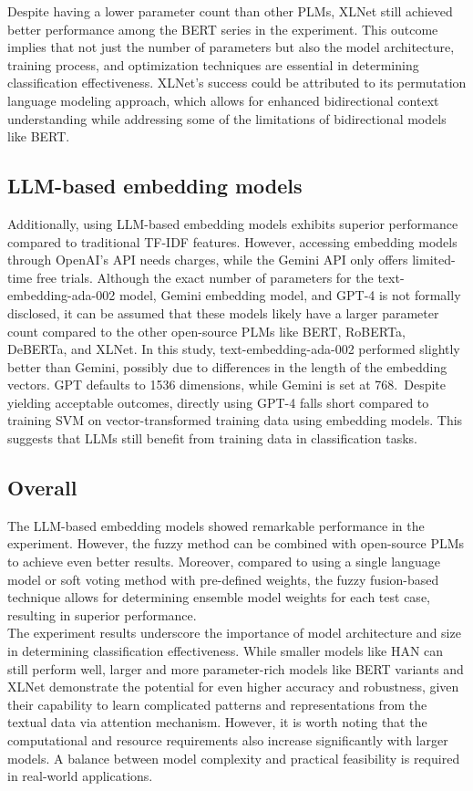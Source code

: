 Despite having a lower parameter count than other PLMs, XLNet still achieved better performance among the BERT series in the experiment. This outcome implies that not just the number of parameters but also the model architecture, training process, and optimization techniques are essential in determining classification effectiveness. XLNet's success could be attributed to its permutation language modeling approach, which allows for enhanced bidirectional context understanding while addressing some of the limitations of bidirectional models like BERT.\\

\subsection{LLM-based embedding models}
Additionally, using LLM-based embedding models exhibits superior performance compared to traditional TF-IDF features. However, accessing embedding models through OpenAI's API needs charges, while the Gemini API only offers limited-time free trials. Although the exact number of parameters for the text-embedding-ada-002 model, Gemini embedding model, and GPT-4 is not formally disclosed, it can be assumed that these models likely have a larger parameter count compared to the other open-source PLMs like BERT, RoBERTa, DeBERTa, and XLNet. In this study, text-embedding-ada-002 performed slightly better than Gemini, possibly due to differences in the length of the embedding vectors. GPT defaults to 1536 dimensions, while Gemini is set at 768. Despite yielding acceptable outcomes, directly using GPT-4 falls short compared to training SVM on vector-transformed training data using embedding models. This suggests that LLMs still benefit from training data in classification tasks. \\

\subsection{Overall}
The LLM-based embedding models showed remarkable performance in the experiment. However, the fuzzy method can be combined with open-source PLMs to achieve even better results. Moreover, compared to using a single language model or soft voting method with pre-defined weights, the fuzzy fusion-based technique allows for determining ensemble model weights for each test case, resulting in superior performance.\\

The experiment results underscore the importance of model architecture and size in determining classification effectiveness. While smaller models like HAN can still perform well, larger and more parameter-rich models like BERT variants and XLNet demonstrate the potential for even higher accuracy and robustness, given their capability to learn complicated patterns and representations from the textual data via attention mechanism. However, it is worth noting that the computational and resource requirements also increase significantly with larger models. A balance between model complexity and practical feasibility is required in real-world applications.

